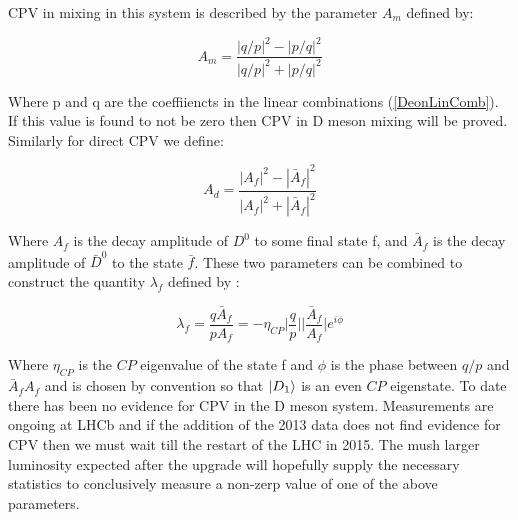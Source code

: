 CPV in mixing in this system is described by the parameter $A_{m}$ defined by:

\begin{equation*}
A_{m} = \frac{|q/p|^{2} - |p/q|^{2}}{|q/p|^{2} + |p/q|^{2}}
\end{equation*}

\noindent Where p and q are the coeffiiencts in the linear combinations (\ref{DeonLinComb}). If this value is found to not be zero then CPV in D meson mixing will be proved. Similarly for direct CPV we define:

\begin{equation*}
A_{d} = \frac{|A_{f}|^{2} - |\bar{A}_{f}|^{2}}{|A_{f}|^{2} + |\bar{A}_{f}|^{2}}
\end{equation*}

\noindent Where $A_{f}$ is the decay amplitude of $D^{0}$ to some final state f, and $\bar{A}_{f}$ is the decay amplitude of $\bar{D}^{0}$ to the state $\bar{f}$. These two parameters can be combined to construct the quantity $\lambda_{f}$ defined by \cite{LHCbAsymmetry}:

\begin{equation*}
\lambda_{f} = \frac{q \bar{A}_{f}}{p A_{f}} = - \eta_{CP} \bigg|\frac{q}{p}\bigg| \bigg|\frac{\bar{A}_{f}}{A_{f}}\bigg| e^{i \phi}
\end{equation*}

\noindent Where $\eta_{CP}$ is the $CP$ eigenvalue of the state f and $\phi$ is the phase between $q/p$ and ${\bar{A}_{f}}{A_{f}}$ and is chosen by convention so that $\ket{D_{1}}$ is an even $CP$ eigenstate. To date there has been no evidence for CPV in the D meson system. Measurements are ongoing at LHCb and if the addition of the 2013 data does not find evidence for CPV then we must wait till the restart of the LHC in 2015. The mush larger luminosity expected after the upgrade will hopefully supply the necessary statistics to conclusively measure a non-zerp value of one of the above parameters. 





